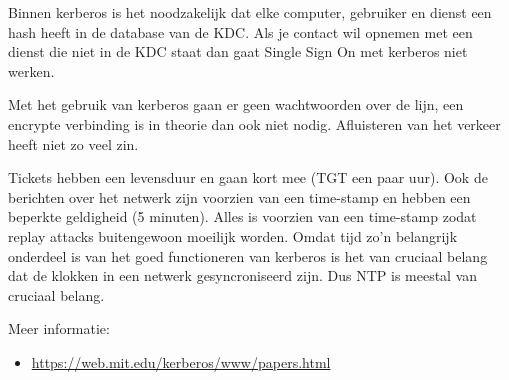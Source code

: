 Binnen kerberos is het noodzakelijk dat elke computer, gebruiker en dienst een hash heeft in de database van de KDC. Als je contact wil opnemen met een dienst die niet in de KDC staat dan gaat Single Sign On met kerberos niet werken.

Met het gebruik van kerberos gaan er geen wachtwoorden over de lijn, een encrypte verbinding is in theorie dan ook niet nodig. Afluisteren van het verkeer heeft niet zo veel zin.

Tickets hebben een levensduur en gaan kort mee (TGT een paar uur). Ook de berichten over het netwerk zijn voorzien van een time-stamp en hebben een beperkte geldigheid (5 minuten). Alles is voorzien van een time-stamp zodat replay attacks buitengewoon moeilijk worden. Omdat tijd zo'n belangrijk onderdeel is van het goed functioneren van kerberos is het van cruciaal belang dat de klokken in een netwerk gesyncroniseerd zijn. Dus NTP is meestal van cruciaal belang.

Meer informatie:
\begin{itemize}
\item \url{https://web.mit.edu/kerberos/www/papers.html}
\end{itemize}


